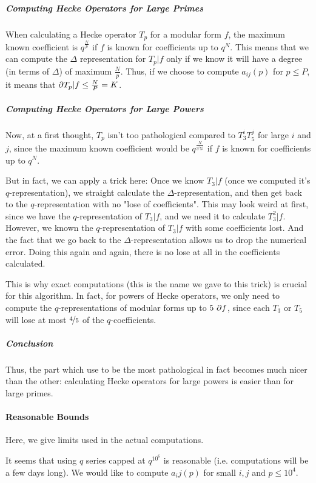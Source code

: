 \subparagraph{Computing Hecke Operators for Large Primes}
When calculating a Hecke operator $T_p$ for a modular form $f$, the maximum known coefficient is $q^{\frac{N}{p}}$ if $f$ is known for coefficients up to $q^{N}$.
This means that we can compute the $\Delta$ representation for $T_p|f$ only if we know it will have a degree (in terms of $\Delta$) of maximum $\frac{N}{p}$.
Thus, if we choose to compute $a_{ij}(p)$ for $p \leq P$, it means that $\partial T_p|f \leq \frac{N}{P} = K$.

\subparagraph{Computing Hecke Operators for Large Powers}
Now, at a first thought, $T_p$ isn't too pathological compared to $T_3^iT_5^j$ for large $i$ and $j$, since the maximum known coefficient would be $q^{\frac{N}{3^i5^j}}$ if $f$ is known for coefficients up to $q^{N}$.

But in fact, we can apply a trick here:
Once we know $T_3|f$ (once we computed it's $q$-representation), we straight calculate the $\Delta$-representation, and then get back to the $q$-representation with no "lose of coefficients".
This may look weird at first, since we have the $q$-representation of $T_3|f$, and we need it to calculate $T_3^2|f$.
However, we known the $q$-representation of $T_3|f$ with some coefficients lost.
And the fact that we go back to the $\Delta$-representation allows us to drop the numerical error.
Doing this again and again, there is no lose at all in the coefficients calculated.

This is why exact computations (this is the name we gave to this trick) is crucial for this algorithm.
In fact, for powers of Hecke operators, we only need to compute the $q$-representations of modular forms up to $5 \ \degree{f}$, since each $T_3$ or $T_5$ will lose at most $\nicefrac{4}{5}$ of the $q$-coefficients.

\subparagraph{Conclusion}
Thus, the part which use to be the most pathological in fact becomes much nicer than the other: calculating Hecke operators for large powers is easier than for large primes.

\paragraph{Reasonable Bounds}
Here, we give limits used in the actual computations.

It seems that using $q$ series capped at $q^{10^6}$ is reasonable (i.e. computations will be a few days long).
We would like to compute $a_ij(p)$ for small $i,j$ and $p \leq 10^4$.

